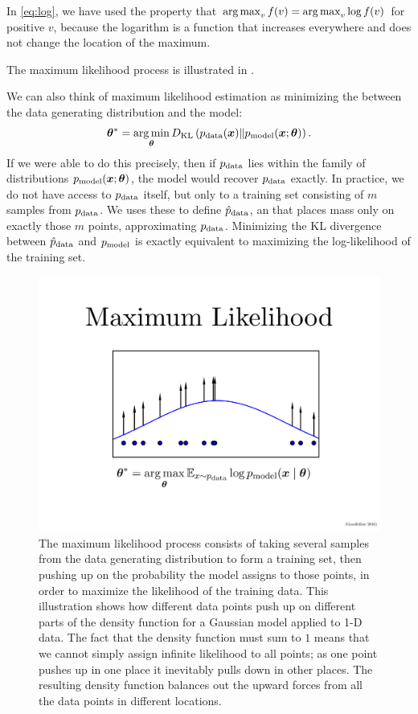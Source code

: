 In \eqref{eq:log}, we have used the property that $\operatorname*{arg\,max}_v f(v) = \operatorname*{arg\,max}_v \log f(v)$ for 
positive $v$, because the logarithm is a function that increases everywhere and does not change
the location of the maximum.

The maximum likelihood process is illustrated in .

We can also think of maximum likelihood estimation as minimizing the
 between the data generating distribution and the
model:
\[ {\bm{\theta}}^* = \operatorname*{arg\,min}_{\bm{\theta}} D_{\mathrm{KL}}\left( p_{\rm{data}}({\bm{x}}) \Vert p_{\rm{model}}({\bm{x}} ; {\bm{\theta}}) \right). \]
If we were able to do this precisely, then if $p_{\rm{data}}$ lies within the family of distributions
$p_{\rm{model}}({\bm{x}} ; {\bm{\theta}})$, the model would recover $p_{\rm{data}}$ exactly.
In practice, we do not have access to $p_{\rm{data}}$ itself, but only to a training set
consisting of $m$ samples from $p_{\rm{data}}$.
We uses these to define $\hat{p}_{\rm{data}}$, an  that places mass only
on exactly those $m$ points, approximating $p_{\rm{data}}$.
Minimizing the KL divergence between $\hat{p}_{\rm{data}}$ and $p_{\rm{model}}$ is exactly equivalent to maximizing
the log-likelihood of the training set.

\begin{figure}
\centering
\includegraphics[width=\textwidth]{mle.pdf}
\caption{The maximum likelihood process consists of taking several samples from
  the data generating distribution to form a training set, then pushing up on the
  probability the model assigns to those points, in order to maximize the likelihood
  of the training data.
  This illustration shows how different data points push up on different parts of
  the density function for a Gaussian model applied to 1-D data.
  The fact that the density function must sum to $1$ means that we cannot simply
  assign infinite likelihood to all points; as one point pushes up in one place
  it inevitably pulls down in other places.
  The resulting density function balances out the upward forces from all the data
  points in different locations.
}
\label{fig:mle}
\end{figure}

